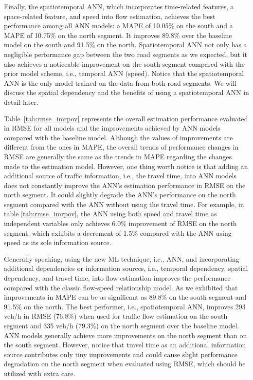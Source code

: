 \documentclass[english]{kththesis}
\begin{document}
Finally, the spatiotemporal ANN, which incorporates time-related features, a space-related feature, and speed into flow estimation, achieves the best performance among all ANN models: a MAPE of 10.05\% on the south and a MAPE of 10.75\% on the north segment. It improves 89.8\% over the baseline model on the south and 91.5\% on the north. Spatiotemporal ANN not only has a negligible performance gap between the two road segments as we expected, but it also achieves a noticeable improvement on the south segment compared with the prior model scheme, i.e., temporal ANN (speed). Notice that the spatiotemporal ANN is the only model trained on the data from both road segments. We will discuss the spatial dependency and the benefits of using a spatiotemporal ANN in detail later.

Table~\ref{tab:rmse_imrpov} represents the overall estimation performance evaluated in RMSE for all models and the improvements achieved by ANN models compared with the baseline model. Although the values of improvements are different from the ones in MAPE, the overall trends of performance changes in RMSE are generally the same as the trends in MAPE regarding the changes made to the estimation model. However, one thing worth notice is that adding an additional source of traffic information, i.e., the travel time, into ANN models does not constantly improve the ANN's estimation performance in RMSE on the north segment. It could slightly degrade the ANN's performance on the north segment compared with the ANN without using the travel time. For example, in table \ref{tab:rmse_imrpov}, the ANN using both speed and travel time as independent variables only achieves 6.0\% improvement of RMSE on the north segment, which exhibits a decrement of 1.5\% compared with the ANN using speed as its sole information source.

Generally speaking, using the new ML technique, i.e., ANN, and incorporating additional dependencies or information sources, i.e., temporal dependency, spatial dependency, and travel time, into flow estimation improves the performance compared with the classic flow-speed relationship model. As we exhibited that improvements in MAPE can be as significant as 89.8\% on the south segment and 91.5\% on the north. The best performer, i.e., spatiotemporal ANN, improves 293 veh/h in RMSE (76.8\%) when used for traffic flow estimation on the south segment and 335 veh/h (79.3\%) on the north segment over the baseline model. ANN models generally achieve more improvements on the north segment than on the south segment. However, notice that travel time as an additional information source contributes only tiny improvements and could cause slight performance degradation on the north segment when evaluated using RMSE, which should be utilized with extra care.
\end{document}
